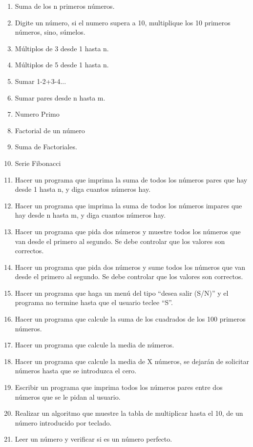\documentclass{scrartcl}
\begin{document}
	\begin{enumerate}
		\item Suma de los n primeros números.
		\item Digite un número, si el numero supera a 10, multiplique los 10 primeros números, sino, súmelos.
		\item Múltiplos de 3 desde 1 hasta n.
		\item Múltiplos de 5 desde 1 hasta n.
		\item Sumar 1-2+3-4...
		\item Sumar pares desde n hasta m.
		\item Numero Primo
		\item Factorial de un número
		\item Suma de Factoriales.
		\item Serie Fibonacci
		\item Hacer un programa que imprima la suma de todos los números pares que hay	desde 1 hasta n, y diga cuantos números hay.
		\item Hacer un programa que imprima la suma de todos los números impares que	hay desde n hasta m, y diga cuantos números hay.
		\item Hacer un programa que pida dos números y muestre todos los números que	van desde el primero al segundo. Se debe controlar que los valores son correctos.
		\item Hacer un programa que pida dos números y sume todos los números que van	desde el primero al segundo. Se debe controlar que los valores son correctos.
		\item Hacer un programa que haga un menú del tipo “desea salir (S/N)” y el		programa no termine hasta que el usuario teclee “S”.
		\item Hacer un programa que calcule la suma de los cuadrados de los 100 primeros números.
		\item Hacer un programa que calcule la media de números.
		\item Hacer un programa que calcule la media de X números, se dejarán de solicitar números hasta que se introduzca el cero.
		
		\item Escribir un programa que imprima todos los números pares entre dos números que		se le pidan al usuario.
		
		\item Realizar un algoritmo que muestre la tabla de multiplicar hasta el 10, de un número		introducido por teclado.
		
		\item Leer un número y verificar si es un número perfecto.
		

\end{enumerate}
\end{document}
